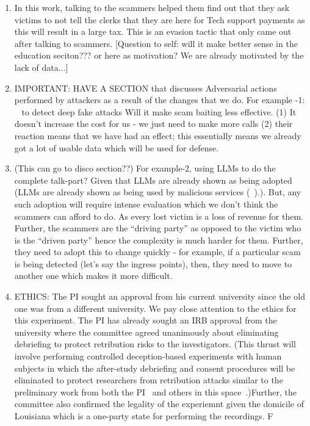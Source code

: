 \begin{enumerate}
\item In this work, talking to the scammers helped them find out that they ask victims to not tell the clerks that they are here for Tech support payments as this will result in a large tax. This is an evasion tactic that only came out after talking to scammers. \cite{ayumu2024threat}   [Question to self: will it make better sense in the education seciton??? or here as motivation? We are already motivated by the lack of data...]
\item IMPORTANT: HAVE A SECTION that discusses Adversarial actions performed by attackers as a result of the changes that we do.  For example -1: ~\cite{KumariAPRAJS25,BlueWAGVOBT22} to detect deep fake attacks Will it make scam baiting less effective. (1) It doesn't increase the cost for us - we just need to make more calls (2) their reaction means that we have had an effect; this essentially means we already got a lot of usable data which will be used for defense.
\item (This can go to disco section??) For example-2, using LLMs to do the complete talk-part? Given that LLMs are already shown as being adopted (\eg LLMs are already shown as being used by malicious services (\eg ~\cite{LinCL024}).). But, any such adoption will require intense evaluation which we don't think the scammers can afford to do. As every lost victim is a loss of revenue for them. Further, the scammers are the ``driving party'' as opposed to the victim who is the ``driven party'' hence the complexity is much harder for them. Further, they need to adopt this to change quickly - for example, if a particular scam is being detected (let's say the ingress points), then, they need to move to another one which makes it more difficult. 

\item  ETHICS: The PI sought an approval from his current university since the old one was from a different university. We pay close attention to the ethics for this experiment. The PI has already sought an IRB approval from the university where the committee agreed unanimously about eliminating debriefing to protect retribution risks to the investigators. (This thrust will involve performing controlled deception-based experiments with human subjects in which the after-study debriefing and consent procedures will be eliminated to protect researchers from retribution attacks similar to the preliminary work from both the PI~\cite{honeytweets} and others in this space~\cite{MiramirkhaniSN16}.)Further, the committee also confirmed the legality of the experiemnt given the domicile of Louisiana which is a one-party state for performing the recordings. F 

\end{enumerate}


